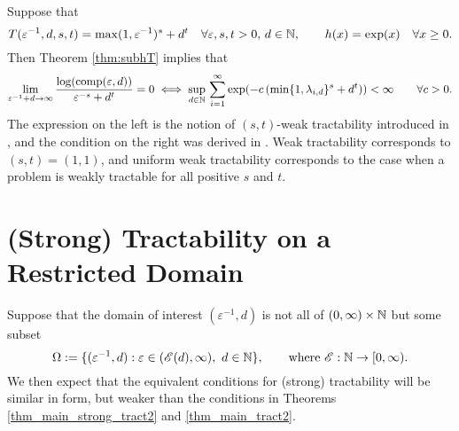 \documentclass[sort&compress]{elsarticle}
\newcommand{\theM}{\mathscr{E}}
\begin{document}
\begin{example}
	Suppose that
	\[
	T(\varepsilon^{-1},d,s,t) = \max(1,\varepsilon^{-1})^s + d^t \quad \forall \varepsilon,s,t > 0, \, d \in \mathbb{N}, \qquad h(x) = \exp(x) \quad \forall x \ge 0.
	\]
	Then Theorem \ref{thm:subhT} implies that
	\[\lim_{\varepsilon^{-1}+d\rightarrow \infty} \frac{\log( \operatorname{comp}(\varepsilon,d))}{\varepsilon^{-s}+d^t} = 0
	\iff
	 \sup_{d\in\mathbb{N}}  \, \sum_{i=1}^\infty \exp(-c\, (\min\{1,\lambda_{i,d}\}^{s} + d^t )) <\infty \qquad \forall c > 0.
	\]
	The expression on the left is the notion of $(s,t)$-weak tractability introduced in \cite{SW15}, and the condition on the right was derived in \cite[Theorem 3.1]{WerWoz17a}.  Weak tractability corresponds to $(s,t)=(1,1)$, and uniform weak tractability corresponds to the case when a problem is weakly tractable for all positive $s$ and $t$.
\end{example}

\section{(Strong) Tractability on a Restricted Domain} \label{sec:restricted}

Suppose that the domain of interest $(\varepsilon^{-1},d)$ is not all of $(0,\infty) \times \mathbb{N}$ but some subset
\begin{equation}
    \Omega  := \{(\varepsilon^{-1},d) : \varepsilon \in (\theM(d),\infty), \ d \in \naturals \}, \qquad \text{where }\theM : \naturals \to [0,\infty).
\end{equation}
We then expect that the equivalent conditions for (strong) tractability will be similar in form, but weaker than the conditions in Theorems  \ref{thm_main_strong_tract2} and \ref{thm_main_tract2}.
\end{document}
